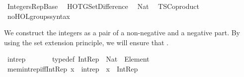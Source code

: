%
\begin{isabellebody}%
%
%
\isadelimdocument
%
\endisadelimdocument
%
\isatagdocument
%
\isamarkuptrue%
%
\endisatagdocument
{\isafolddocument}%
%
\isadelimdocument
%
\endisadelimdocument
%
\isadelimtheory
%
\endisadelimtheory
%
\isatagtheory
{}\isamarkupfalse%
\ Integers{\isacharunderscore}{\kern0pt}Rep{\isacharunderscore}{\kern0pt}Base\isanewline
{}\isanewline
\ \ HOTG{\isachardot}{\kern0pt}Set{\isacharunderscore}{\kern0pt}Difference\isanewline
\ \ Nat\isanewline
\ \ TSCoproduct\isanewline
{}%
\endisatagtheory
{\isafoldtheory}%
%
\isadelimtheory
\isanewline
%
\endisadelimtheory
\isanewline
{}\isamarkupfalse%
\ no{\isacharunderscore}{\kern0pt}HOL{\isacharunderscore}{\kern0pt}groups{\isacharunderscore}{\kern0pt}syntax%
\begin{isamarkuptext}%
We construct the integers as a pair of a non-negative and a negative part.
By using the set extension principle, we will ensure that \isa{{\isasymnat}\ {\isasymsubseteq}\ {\isasymint}}.%
\end{isamarkuptext}\isamarkuptrue%
\isamarkupfalse%
\ {\isachardoublequoteopen}int{\isacharunderscore}{\kern0pt}rep\ {\isasymequiv}\ {\isasymnat}\ {\isasymCoprod}\ {\isacharparenleft}{\kern0pt}{\isasymnat}\ {\isasymsetminus}\ {\isacharbraceleft}{\kern0pt}{}{\isacharbraceright}{\kern0pt}{\isacharparenright}{\kern0pt}{\isachardoublequoteclose}\isanewline
\isanewline
{}\isamarkupfalse%
\ {\isacharbrackleft}{\kern0pt}typedef{\isacharbrackright}{\kern0pt}{\isacharcolon}{\kern0pt}\ {\isachardoublequoteopen}Int{\isacharunderscore}{\kern0pt}Rep\ {\isacharequal}{\kern0pt}\ Nat\ {\isasymCoprod}\ Element\ {\isacharparenleft}{\kern0pt}{\isasymnat}\ {\isasymsetminus}\ {\isacharbraceleft}{\kern0pt}{}{\isacharbraceright}{\kern0pt}{\isacharparenright}{\kern0pt}{\isachardoublequoteclose}\isanewline
\isanewline
%
\isanewline
{}\isamarkupfalse%
\ mem{\isacharunderscore}{\kern0pt}int{\isacharunderscore}{\kern0pt}rep{\isacharunderscore}{\kern0pt}iff{\isacharunderscore}{\kern0pt}Int{\isacharunderscore}{\kern0pt}Rep{\isacharcolon}{\kern0pt}\ {\isachardoublequoteopen}x\ {\isasymin}\ int{\isacharunderscore}{\kern0pt}rep\ {\isasymlongleftrightarrow}\ x\ {\isacharcolon}{\kern0pt}\ Int{\isacharunderscore}{\kern0pt}Rep{\isachardoublequoteclose}\isanewline

\end{isabellebody}
